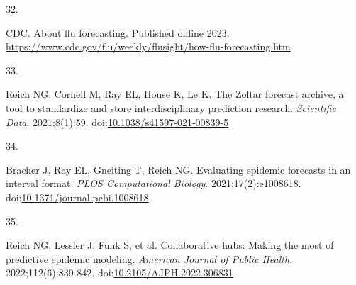 \documentclass[
  letterpaper,
  DIV=11,
  numbers=noendperiod]{scrartcl}
\newlength{\cslhangindent}
\newlength{\csllabelwidth}
\newenvironment{CSLReferences}[2] %
 {\begin{list}{}{%
  \setlength{\itemindent}{0pt}
  \setlength{\leftmargin}{0pt}
  \setlength{\parsep}{0pt}
  \ifodd #1
   \setlength{\leftmargin}{\cslhangindent}
   \setlength{\itemindent}{-1\cslhangindent}
  \fi
  \setlength{\itemsep}{#2\baselineskip}}}
 {\end{list}}
\newcommand{\CSLLeftMargin}[1]{\parbox[t]{\csllabelwidth}{\strut#1\strut}}
\newcommand{\CSLRightInline}[1]{\parbox[t]{\linewidth - \csllabelwidth}{\strut#1\strut}}
\begin{document}
\begin{CSLReferences}{0}{1}
\CSLLeftMargin{32. }%
\CSLRightInline{CDC. About flu forecasting. Published online 2023.
\url{https://www.cdc.gov/flu/weekly/flusight/how-flu-forecasting.htm}}

\CSLLeftMargin{33. }%
\CSLRightInline{Reich NG, Cornell M, Ray EL, House K, Le K. The {Zoltar}
forecast archive, a tool to standardize and store interdisciplinary
prediction research. \emph{Scientific Data}. 2021;8(1):59.
doi:\href{https://doi.org/10.1038/s41597-021-00839-5}{10.1038/s41597-021-00839-5}}

\CSLLeftMargin{34. }%
\CSLRightInline{Bracher J, Ray EL, Gneiting T, Reich NG. Evaluating
epidemic forecasts in an interval format. \emph{PLOS Computational
Biology}. 2021;17(2):e1008618.
doi:\href{https://doi.org/10.1371/journal.pcbi.1008618}{10.1371/journal.pcbi.1008618}}

\CSLLeftMargin{35. }%
\CSLRightInline{Reich NG, Lessler J, Funk S, et al. Collaborative hubs:
Making the most of predictive epidemic modeling. \emph{American Journal
of Public Health}. 2022;112(6):839-842.
doi:\href{https://doi.org/10.2105/AJPH.2022.306831}{10.2105/AJPH.2022.306831}}

\end{CSLReferences}
\end{document}
